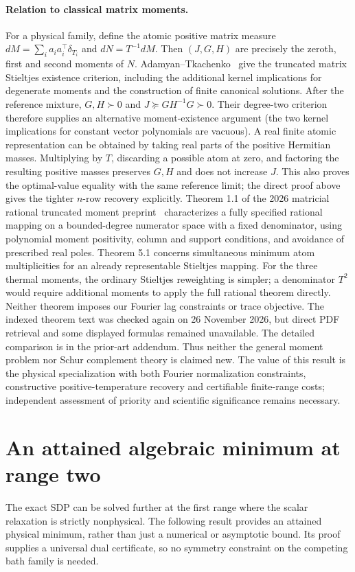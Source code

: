\documentclass[11pt]{article}
\begin{document}
\paragraph{Relation to classical matrix moments.}
For a physical family, define the atomic positive matrix measure $dM=\sum_i a_i a_i^\top\delta_{T_i}$ and $dN=T^{-1}dM$. Then $(J,G,H)$ are precisely the zeroth, first and second moments of $N$. Adamyan--Tkachenko~\cite[Thm.~2.1 and Sec.~2]{adamyan} give the truncated matrix Stieltjes existence criterion, including the additional kernel implications for degenerate moments and the construction of finite canonical solutions. After the reference mixture, $G,H\succ0$ and $J\succeq GH^{-1}G\succ0$. Their degree-two criterion therefore supplies an alternative moment-existence argument (the two kernel implications for constant vector polynomials are vacuous). A real finite atomic representation can be obtained by taking real parts of the positive Hermitian masses. Multiplying by $T$, discarding a possible atom at zero, and factoring the resulting positive masses preserves $G,H$ and does not increase $J$. This also proves the optimal-value equality with the same reference limit; the direct proof above gives the tighter $n$-row recovery explicitly. Theorem 1.1 of the 2026 matricial rational truncated moment preprint~\cite{zalar2026} characterizes a fully specified rational mapping on a bounded-degree numerator space with a fixed denominator, using polynomial moment positivity, column and support conditions, and avoidance of prescribed real poles. Theorem 5.1 concerns simultaneous minimum atom multiplicities for an already representable Stieltjes mapping. For the three thermal moments, the ordinary Stieltjes reweighting is simpler; a denominator $T^2$ would require additional moments to apply the full rational theorem directly. Neither theorem imposes our Fourier lag constraints or trace objective. The indexed theorem text was checked again on 26 November 2026, but direct PDF retrieval and some displayed formulas remained unavailable. The detailed comparison is in the prior-art addendum. Thus neither the general moment problem nor Schur complement theory is claimed new. The value of this result is the physical specialization with both Fourier normalization constraints, constructive positive-temperature recovery and certifiable finite-range costs; independent assessment of priority and scientific significance remains necessary.

\section{An attained algebraic minimum at range two}\label{sec:range2exact}
The exact SDP can be solved further at the first range where the scalar relaxation is strictly nonphysical. The following result provides an attained physical minimum, rather than just a numerical or asymptotic bound. Its proof supplies a universal dual certificate, so no symmetry constraint on the competing bath family is needed.
\end{document}
